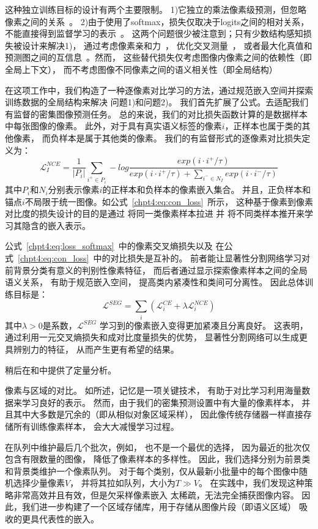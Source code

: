 % 
% 
% 
% 
这种独立训练目标的设计有两个主要限制。
1)它独立的乘法像素级预测，但忽略像素之间的关系~\cite{zhao2019region}。
2)由于使用了softmax，损失仅取决于logits之间的相对关系，
不能直接得到监督学习的表示~\cite{pang2019rethinking}。
这两个问题很少被注意到；只有少数结构感知损失被设计来解决1)，
通过考虑像素亲和力~\cite{ke2018adaptive}，
优化交叉测量~\cite{berman2018lovasz}，
或者最大化真值和预测图之间的互信息~\cite{zhao2019region}。然而，
这些替代损失仅考虑图像内像素之间的依赖性（即全局上下文），
而不考虑图像不同像素之间的语义相关性（即全局结构）
\par
% 
% 
% 
% 
在这项工作中，我们构造了一种逐像素对比学习的方法，通过规范嵌入空间并探索训练数据的全局结构来解决
问题1)和问题2)。
我们首先扩展了公式。去适配我们有监督的密集图像预测任务。
总的来说，我们的对比损失函数计算的是数据样本中每张图像的像素。
此外，对于具有真实语义标签的像素$i$，正样本也属于类的其他像素，
而负样本是属于其他类的像素。
我们的有监督形式的逐像素对比损失定义为：
\begin{equation}
\mathcal{L} _{I}^{NCE}= 
\frac{1}{|P_{i}|}
\sum_{i^{+}\in P_{i}}^{}  
-log \frac
{exp(i \cdot i^{+ }/\tau )}
{exp(i \cdot i^{+}/\tau )+ \sum_{i^{-}\in N_{I}} exp(i \cdot i^{-}/\tau )} 
\label{chpt4:eq:con_loss}
\end{equation}
% 
% 
% 
% 
其中$P_{i}$和$N_{i}$分别表示像素$i$的正样本和负样本的像素嵌入集合。
并且，正负样本和锚点$i$不局限于统一图像。如公式~\ref{chpt4:eq:con_loss}~所示，
这种基于像素到像素对比度的损失设计的目的是通过
将同一类像素样本拉进
并
将不同类样本推开来学习其隐含的嵌入表示。
\par
% 
% 
% 
% 
公式~\ref{chpt4:eq:loss_softmax}~中的像素交叉熵损失以及
在公式~\ref{chpt4:eq:con_loss}~中的对比损失是互补的。
前者能让显著性分割网络学习对前背景分类有意义的判别性像素特征，
而后者通过显示探索像素样本之间的全局语义关系，
有助于规范嵌入空间，
提高类内紧凑性和类间可分离性。
因此总体训练目标是：
\begin{equation}
	\mathcal{L}^{SEG}=\sum_{i}\left ( 
		\mathcal{L}_{i}^{CE} + 
		\lambda \mathcal{L}_{i}^{NCE}  
	\right ) 
\end{equation}
% 
% 
% 
% 
其中$\lambda > 0 $是系数，$\mathcal{L}^{SEG}$
学习到的像素嵌入变得更加紧凑且分离良好。
这表明，通过利用一元交叉熵损失和成对比度量损失的优势，
显著性分割网络可以生成更具辨别力的特征，
从而产生更有希望的结果。

稍后在\todo 和\todo 中提供了定量分析。


像素与区域的对比。
如\todo 所述，记忆是一项关键技术，
有助于对比学习利用海量数据来学习良好的表示。
然而，由于我们的密集预测设置中有大量的像素样本，
并且其中大多数是冗余的（即从相似对象区域采样），
因此像传统存储器一样直接存储所有训练像素样本\todo ，
会大大减慢学习过程。
\par
% 
% 
% 
% 
在队列中维护最后几个批次，例如\todo，
也不是一个最优的选择，
因为最近的批次仅包含有限数量的图像，
降低了像素样本的多样性。
因此，我们选择分别为前景类和背景类维护一个像素队列。
对于每个类别，仅从最新小批量中的每个图像中随机选择少量像素$V$，
并将其拉如队列，大小为$T \gg  V$。
% 
% 
% 
% 
在实践中，我们发现这种策略非常高效并且有效，但是欠采样像素嵌入
太稀疏，无法完全捕获图像内容。
因此，我们进一步构建了一个区域存储库，用于存储从图像片段（即语义区域）
吸收的更具代表性的嵌入。


